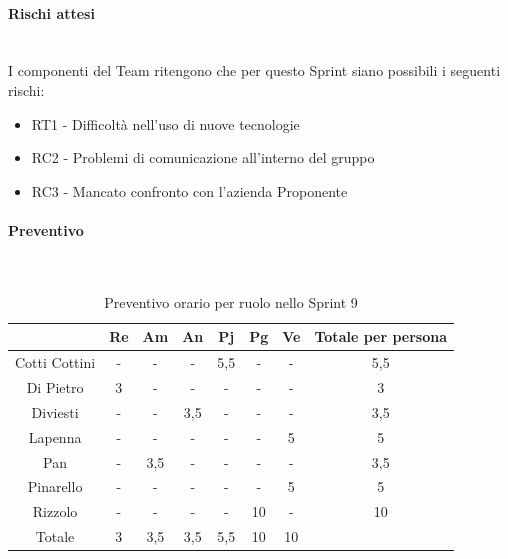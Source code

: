 \documentclass{article}
\begin{document}
                \paragraph{Rischi attesi}\mbox{}\\
                I componenti del Team ritengono che per questo Sprint siano possibili i seguenti rischi:
                \begin{itemize}
                    \item RT1 - Difficoltà nell’uso di nuove tecnologie
                    \item RC2 - Problemi di comunicazione all’interno del gruppo
                    \item RC3 - Mancato confronto con l’azienda Proponente
                \end{itemize}

                \paragraph{Preventivo}\mbox{}\\
                \begin{table}[H]
                    \centering
                    \begin{tabular}{|c|c|c|c|c|c|c|c|}
                    \hline
                                  & Re  & Am  & An  & Pj  & Pg  & Ve  & Totale per persona \\ \hline
                    Cotti Cottini & -   & -   & -   & 5,5 & -   & -   & 5,5                \\ \hline
                    Di Pietro     & 3   & -   & -   & -   & -   & -   & 3                  \\ \hline
                    Diviesti      & -   & -   & 3,5 & -   & -   & -   & 3,5                \\ \hline
                    Lapenna       & -   & -   & -   & -   & -   & 5   & 5                  \\ \hline
                    Pan           & -   & 3,5 & -   & -   & -   & -   & 3,5                \\ \hline
                    Pinarello     & -   & -   & -   & -   & -   & 5   & 5                  \\ \hline
                    Rizzolo       & -   & -   & -   & -   & 10  & -   & 10                 \\ \hline
                    Totale        & 3   & 3,5 & 3,5 & 5,5 & 10  & 10  &                    \\ \hline
                    \end{tabular}
                    \caption{Preventivo orario per ruolo nello Sprint 9}
                \end{table}
\end{document}

